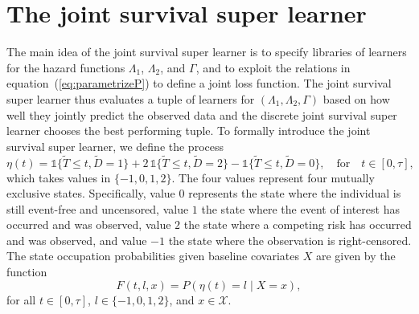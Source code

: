 \documentclass[a4paper,danish]{article}
\newcommand{\1}{\mathds{1}}
\theoremstyle{plain} %
\numberwithin{theorem}{section}
\theoremstyle{definition} %
\theoremstyle{remark}
\begin{document}
\section{The joint survival super learner}
\label{sec:joint-survival-super-learner}

The main idea of the joint survival super learner is to specify
libraries of learners for the hazard functions \( \Lambda_1 \), \(
\Lambda_2 \), and \( \Gamma \), and to exploit the relations in
equation~(\ref{eq:parametrizeP}) to define a joint loss function. The
joint survival super learner thus evaluates a tuple of learners for \(
(\Lambda_1, \Lambda_2, \Gamma) \) based on how well they jointly
predict the observed data and the discrete joint survival super
learner chooses the best performing tuple. To formally introduce the
joint survival super learner, we define the process
\begin{equation*}
  \eta(t) = \1\{\tilde{T} \leq t, \tilde D=1\} + 2\,\1\{\tilde{T} \leq t, \tilde
  D=2\} - \1\{\tilde{T} \leq t, \tilde D=0\},
  \quad \text{for} \quad t \in [0, \tau],
\end{equation*}
which takes values in \( \{-1,0,1,2\}\). The four values represent
four mutually exclusive states. Specifically, value \( 0 \) represents
the state where the individual is still event-free and uncensored,
value \( 1\) the state where the event of interest has occurred and
was observed, value \( 2\) the state where a competing risk has
occurred and was observed, and value \( -1\) the state where the
observation is right-censored. The state occupation probabilities
given baseline covariates \( X \) are given by the function
\begin{equation}
  \label{eq:F-def}
  F(t, l, x) = P(\eta(t) = l \mid X=x),
\end{equation}
for all \( t \in [0,\tau] \), \( l \in \{-1,0,1,2\} \), and
\( x \in \mathcal{X} \).
\end{document}
